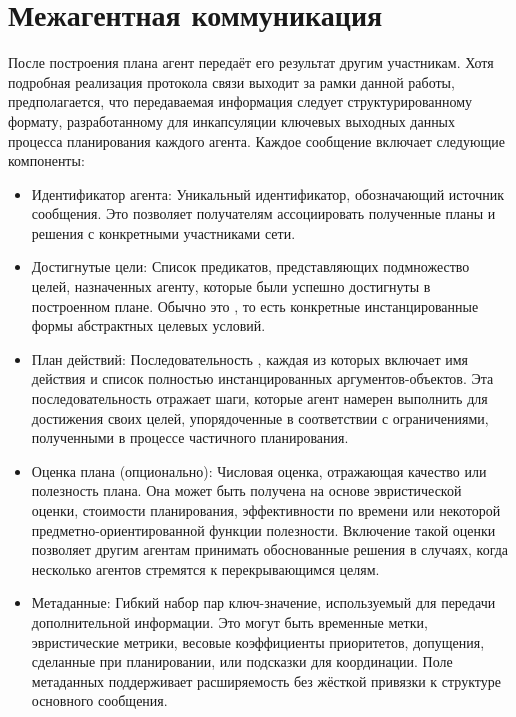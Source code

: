 \section{Межагентная коммуникация}

После построения плана агент передаёт его результат другим участникам.
Хотя подробная реализация протокола связи выходит за рамки данной работы,
предполагается, что передаваемая информация следует структурированному формату,
разработанному для инкапсуляции ключевых выходных данных процесса планирования каждого агента.
Каждое сообщение включает следующие компоненты:
\begin{itemize}
  \item Идентификатор агента: Уникальный идентификатор, обозначающий
    источник сообщения. Это позволяет получателям ассоциировать полученные планы и решения
    с конкретными участниками сети.
  \item Достигнутые цели: Список предикатов, представляющих
    подмножество целей, назначенных агенту,
    которые были успешно достигнуты в построенном плане.
    Обычно это ,
    то есть конкретные инстанцированные формы абстрактных целевых условий.
  \item План действий: Последовательность ,
    каждая из которых включает имя действия и
    список полностью инстанцированных аргументов-объектов.
    Эта последовательность отражает шаги, которые агент намерен выполнить
    для достижения своих целей, упорядоченные в соответствии с ограничениями,
    полученными в процессе частичного планирования.
  \item Оценка плана (опционально): Числовая оценка,
    отражающая качество или полезность плана.
    Она может быть получена на основе эвристической оценки,
    стоимости планирования, эффективности по времени
    или некоторой предметно-ориентированной функции полезности.
    Включение такой оценки позволяет другим агентам принимать обоснованные решения
    в случаях, когда несколько агентов стремятся к перекрывающимся целям.
  \item Метаданные: Гибкий набор пар ключ-значение,
    используемый для передачи дополнительной информации.
    Это могут быть временные метки, эвристические метрики, весовые коэффициенты приоритетов,
    допущения, сделанные при планировании, или подсказки для координации.
    Поле метаданных поддерживает расширяемость
    без жёсткой привязки к структуре основного сообщения.
\end{itemize}

